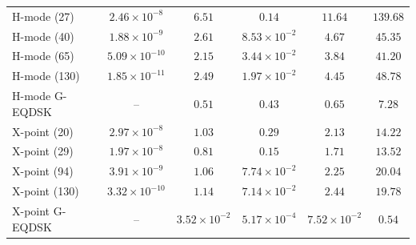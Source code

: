 \documentclass[final, 3p, times]{elsarticle}
\begin{document}
\begin{table}[tb]
\begin{tabular}{l c c c c c}
        H-mode (27)      & $2.46\times 10^{-8}$          & $6.51$                                                    & $0.14$                                            & $11.64$                                              & $139.68$                              \\
        H-mode (40)      & $1.88\times 10^{-9}$          & $2.61$                                                    & $8.53\times 10^{-2}$                              & $4.67$                                               & $45.35$                               \\
        H-mode (65)      & $5.09\times 10^{-10}$         & $2.15$                                                    & $3.44\times 10^{-2}$                              & $3.84$                                               & $41.20$                               \\
        H-mode (130)     & $1.85\times 10^{-11}$         & $2.49$                                                    & $1.97\times 10^{-2}$                              & $4.45$                                               & $48.78$                               \\
        H-mode G-EQDSK   & --                            & $0.51$                                                    & $0.43$                                            & $0.65$                                               & $7.28$                                \\
        X-point (20)     & $2.97\times 10^{-8}$          & $1.03$                                                    & $0.29$                                            & $2.13$                                               & $14.22$                               \\
        X-point (29)     & $1.97\times 10^{-8}$          & $0.81$                                                    & $0.15$                                            & $1.71$                                               & $13.52$                               \\
        X-point (94)     & $3.91\times 10^{-9}$          & $1.06$                                                    & $7.74\times 10^{-2}$                              & $2.25$                                               & $20.04$                               \\
        X-point (130)    & $3.32\times 10^{-10}$         & $1.14$                                                    & $7.14\times 10^{-2}$                              & $2.44$                                               & $19.78$                               \\
        X-point G-EQDSK  & --                            & $3.52\times 10^{-2}$                                      & $5.17\times 10^{-4}$                              & $7.52\times 10^{-2}$                                 & $0.54$                                \\
        \hline
    \end{tabular}
    \label{tab:residual-diagnostics}
\end{table}
\end{document}
